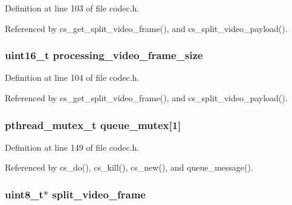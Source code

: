 Definition at line 103 of file codec.\+h.



Referenced by cs\+\_\+get\+\_\+split\+\_\+video\+\_\+frame(), and cs\+\_\+split\+\_\+video\+\_\+payload().

\hypertarget{struct___c_s_session_a7048faa402d6aecd2626ed85f352f5f2}{
\subsubsection[{processing\+\_\+video\+\_\+frame\+\_\+size}]{\setlength{\rightskip}{0pt plus 5cm}uint16\+\_\+t processing\+\_\+video\+\_\+frame\+\_\+size}}\label{struct___c_s_session_a7048faa402d6aecd2626ed85f352f5f2}


Definition at line 104 of file codec.\+h.



Referenced by cs\+\_\+get\+\_\+split\+\_\+video\+\_\+frame(), and cs\+\_\+split\+\_\+video\+\_\+payload().

\hypertarget{struct___c_s_session_aa1e20c410f3ec23066afb256fa3d1254}{
\subsubsection[{queue\+\_\+mutex}]{\setlength{\rightskip}{0pt plus 5cm}pthread\+\_\+mutex\+\_\+t queue\+\_\+mutex\mbox{[}1\mbox{]}}}\label{struct___c_s_session_aa1e20c410f3ec23066afb256fa3d1254}


Definition at line 149 of file codec.\+h.



Referenced by cs\+\_\+do(), cs\+\_\+kill(), cs\+\_\+new(), and queue\+\_\+message().

\hypertarget{struct___c_s_session_a100e5e445d6e9ff7775a1020dc780e56}{
\subsubsection[{split\+\_\+video\+\_\+frame}]{\setlength{\rightskip}{0pt plus 5cm}uint8\+\_\+t$\ast$ split\+\_\+video\+\_\+frame}}\label{struct___c_s_session_a100e5e445d6e9ff7775a1020dc780e56}


